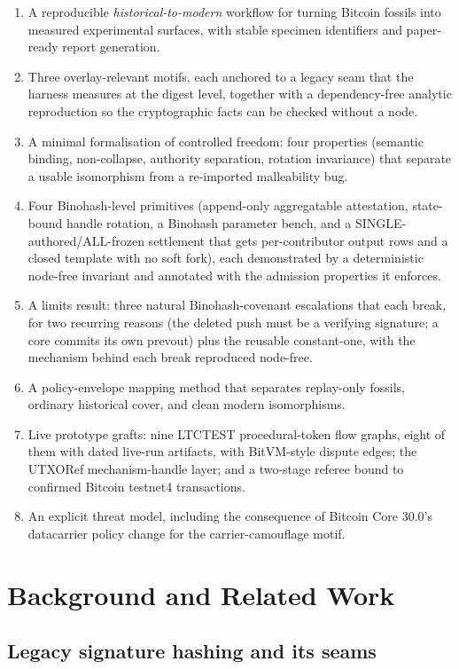 \documentclass[11pt]{article}
\begin{document}
\begin{enumerate}
\item A reproducible \emph{historical-to-modern} workflow for turning Bitcoin
fossils into measured experimental surfaces, with stable specimen identifiers
and paper-ready report generation.
\item Three overlay-relevant motifs, each anchored to a legacy seam that the
harness measures at the digest level, together with a dependency-free analytic
reproduction so the cryptographic facts can be checked without a node.
\item A minimal formalisation of controlled freedom: four properties
(semantic binding, non-collapse, authority separation, rotation invariance)
that separate a usable isomorphism from a re-imported malleability bug.
\item Four Binohash-level primitives (append-only aggregatable attestation,
state-bound handle rotation, a Binohash parameter bench, and a
SINGLE-authored/ALL-frozen settlement that gets per-contributor output rows and
a closed template with no soft fork), each demonstrated by a deterministic
node-free invariant and annotated with the admission properties it enforces.
\item A limits result: three natural Binohash-covenant escalations that each
break, for two recurring reasons (the deleted push must be a verifying
signature; a core commits its own prevout) plus the reusable constant-one, with
the mechanism behind each break reproduced node-free.
\item A policy-envelope mapping method that separates replay-only fossils,
ordinary historical cover, and clean modern isomorphisms.
\item Live prototype grafts: nine LTCTEST procedural-token flow graphs, eight of
them with dated live-run artifacts, with BitVM-style dispute edges; the UTXORef
mechanism-handle layer; and a two-stage referee bound to confirmed Bitcoin
testnet4 transactions.
\item An explicit threat model, including the consequence of Bitcoin Core 30.0's
datacarrier policy change for the carrier-camouflage motif.
\end{enumerate}

\section{Background and Related Work}
\label{sec:related}

\subsection{Legacy signature hashing and its seams}
\end{document}
